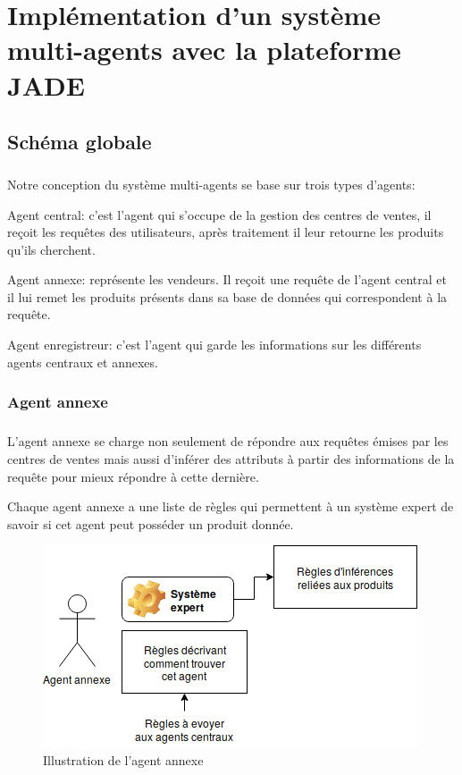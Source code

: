 \chapter{Implémentation d'un système multi-agents avec la plateforme JADE}
\section{Schéma globale}
\paragraph{}
Notre conception du système multi-agents se base sur trois types d’agents:

Agent central: c’est l’agent qui s’occupe de la gestion des centres de ventes, il reçoit les requêtes des utilisateurs, après traitement il leur retourne les produits qu’ils cherchent.

Agent annexe: représente les vendeurs. Il reçoit une requête de l’agent central et il lui remet les produits présents dans sa base de données qui correspondent  à la requête.

Agent enregistreur: c’est l’agent qui garde les informations sur les différents agents centraux et annexes.
\newpage
\subsection{Agent annexe}
\paragraph{}
L’agent annexe se charge non seulement de répondre aux requêtes émises  par les centres de ventes mais aussi d’inférer des attributs à partir des informations de la requête pour mieux répondre à cette dernière.

Chaque agent annexe a une liste de règles qui permettent à un système expert de savoir si cet agent peut posséder un produit donnée.
\begin{figure}[H]
	\centering
	\includegraphics[scale=0.75]{imgs/annexeAgent.png}
	\caption{Illustration de l'agent annexe}
	\label{fig:annexeAgent}
\end{figure}

